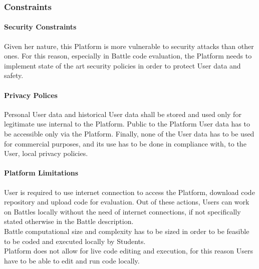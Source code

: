 \subsubsection{Constraints}
\paragraph{Security Constraints}
Given her nature, this Platform is more vulnerable to security attacks than other ones. For this reason, especially in Battle code evaluation, the Platform needs to implement state of the art security policies in order to protect User data and safety.
\paragraph{Privacy Polices}
Personal User data and historical User data shall be stored and used only for legitimate use internal to the Platform. Public to the Platform User data has to be accessible only via the Platform. Finally, none of the User data has to be used for commercial purposes, and its use has to be done in compliance with, to the User, local privacy policies. 
\paragraph{Platform Limitations}
User is required to use internet connection to access the Platform, download code repository and upload code for evaluation. Out of these actions, Users can work on Battles locally without the need of internet connections, if not specifically stated otherwise in the Battle description.\\
Battle computational size and complexity has to be sized in order to be feasible to be coded and executed locally by Students.\\
Platform does not allow for live code editing and execution, for this reason Users have to be able to edit and run code locally.